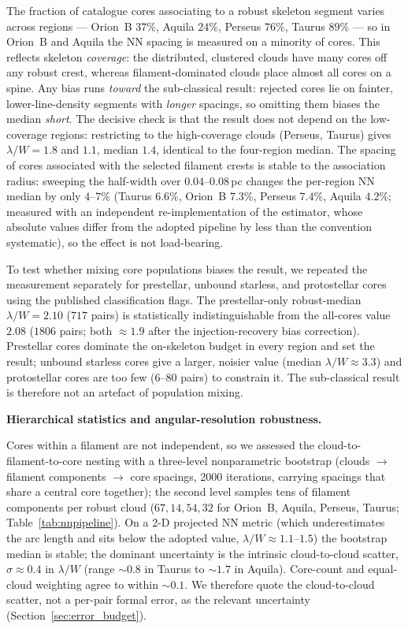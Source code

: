 \documentclass[usenatbib,twoside,twocolumn]{mnras}
\begin{document}
The fraction of catalogue cores associating to a robust skeleton segment varies across regions --- Orion~B $37\%$, Aquila $24\%$, Perseus $76\%$, Taurus $89\%$ --- so in Orion~B and Aquila the NN spacing is measured on a minority of cores. This reflects skeleton \emph{coverage}: the distributed, clustered clouds have many cores off any robust crest, whereas filament-dominated clouds place almost all cores on a spine. Any bias runs \emph{toward} the sub-classical result: rejected cores lie on fainter, lower-line-density segments with \emph{longer} spacings, so omitting them biases the median \emph{short}. The decisive check is that the result does not depend on the low-coverage regions: restricting to the high-coverage clouds (Perseus, Taurus) gives $\lambda/W=1.8$ and $1.1$, median $1.4$, identical to the four-region median. The spacing of cores associated with the selected filament crests is stable to the association radius: sweeping the half-width over $0.04$--$0.08$\,pc changes the per-region NN median by only $4$--$7\%$ (Taurus $6.6\%$, Orion~B $7.3\%$, Perseus $7.4\%$, Aquila $4.2\%$; measured with an independent re-implementation of the estimator, whose absolute values differ from the adopted pipeline by less than the convention systematic), so the effect is not load-bearing.

To test whether mixing core populations biases the result, we repeated the measurement separately for prestellar, unbound starless, and protostellar cores using the published classification flags. The prestellar-only robust-median $\lambda/W=2.10$ ($717$ pairs) is statistically indistinguishable from the all-cores value $2.08$ ($1806$ pairs; both $\approx1.9$ after the injection-recovery bias correction). Prestellar cores dominate the on-skeleton budget in every region and set the result; unbound starless cores give a larger, noisier value (median $\lambda/W\approx3.3$) and protostellar cores are too few ($6$--$80$ pairs) to constrain it. The sub-classical result is therefore not an artefact of population mixing.

\smallskip\noindent\textbf{Hierarchical statistics and angular-resolution robustness.}

Cores within a filament are not independent, so we assessed the cloud-to-filament-to-core nesting with a three-level nonparametric bootstrap (clouds $\to$ filament components $\to$ core spacings, 2000 iterations, carrying spacings that share a central core together); the second level samples tens of filament components per robust cloud ($67,14,54,32$ for Orion~B, Aquila, Perseus, Taurus; Table~\ref{tab:nnpipeline}). On a 2-D projected NN metric (which underestimates the arc length and sits below the adopted value, $\lambda/W\approx1.1$--$1.5$) the bootstrap median is stable; the dominant uncertainty is the intrinsic cloud-to-cloud scatter, $\sigma\approx0.4$ in $\lambda/W$ (range $\sim0.8$ in Taurus to $\sim1.7$ in Aquila). Core-count and equal-cloud weighting agree to within $\sim0.1$. We therefore quote the cloud-to-cloud scatter, not a per-pair formal error, as the relevant uncertainty (Section~\ref{sec:error_budget}).
\end{document}
